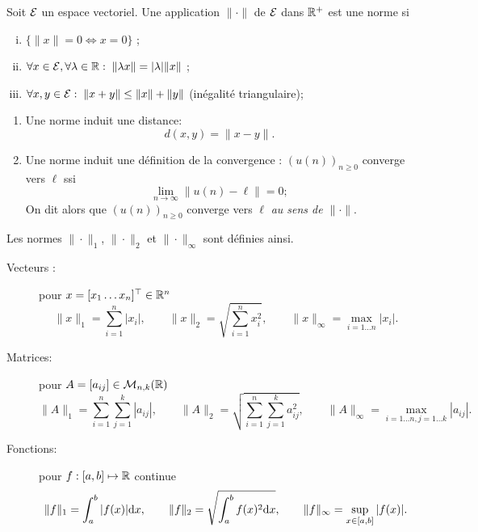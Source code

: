 \begin{definition}[Norme]
  Soit $\mathcal{E}$ un espace vectoriel. Une application $\|\cdot\|$ de $\mathcal{E}$ dans $\mathbb{R}^+$ est une norme si
  \begin{enumerate}[(i)]
    \item $\{\|x\| = 0 \Leftrightarrow x = 0\}$ ;
    \item $\forall x \in \mathcal{E}, \forall \lambda \in \mathbb{R}: \; \|\lambda x\| = |\lambda| \|x\|$ ;
    \item $\forall x, y \in \mathcal{E}: \; \|x+y\| \leq \|x\| + \|y\|$ (inégalité triangulaire);
  \end{enumerate}
\end{definition}

\remarks
\begin{enumerate}
  \item Une norme induit une distance:
  $$
  d(x, y) = \|x - y\|.
  $$
  \item Une norme induit une définition de la convergence : $(u(n))_{n \geq 0}$ converge vers $\ell$ ssi
  $$
  \lim_{n \to \infty} \|u(n) - \ell\| = 0;
  $$
  On dit alors que $(u(n))_{n \geq 0}$ converge vers $\ell$ {\em au sens de $\|\cdot\|$}.
\end{enumerate}

\begin{definition}
  Les normes $\|\cdot\|_1$, $\|\cdot\|_2$ et $\|\cdot\|_\infty$ sont définies ainsi.
  \begin{description}
    \item[Vecteurs :] pour $x = [x_1 \dots x_n]^\top \in \mathbb{R}^n$
    $$
    \|x\|_1 = \sum_{i=1}^n |x_i|, \qquad 
    \|x\|_2 = \sqrt{\sum_{i=1}^n x_i^2}, \qquad 
    \|x\|_\infty = \max_{i = 1 \dots n} |x_i|. 
    $$
    \item[Matrices:] pour $A = [a_{ij}] \in \mathcal{M}_{n, k}(\mathbb{R})$
    $$
    \|A\|_1 = \sum_{i=1}^n \sum_{j=1}^k |a_{ij}|, \qquad 
    \|A\|_2 = \sqrt{\sum_{i=1}^n \sum_{j=1}^k a_{ij}^2}, \qquad 
    \|A\|_\infty = \max_{i = 1 \dots n, j = 1 \dots k} |a_{ij}|. 
    $$
    \item[Fonctions:] pour $f : [a, b] \mapsto \mathbb{R}$ continue
    $$
    \|f\|_1 = \int_a^b |f(x)| \text{d} x, \qquad 
    \|f\|_2 = \sqrt{\int_a^b f(x)^2 \text{d} x}, \qquad 
    \|f\|_\infty = \sup_{x \in [a, b]} |f(x)|.
    $$
  \end{description}
\end{definition}

